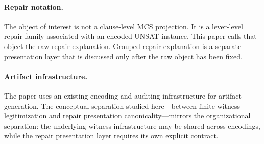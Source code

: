 \paragraph{Repair notation.}
The object of interest is not a clause-level MCS projection.
It is a lever-level repair family associated with an encoded UNSAT instance.
This paper calls that object the raw repair explanation.
Grouped repair explanation is a separate presentation layer that is discussed only after the raw object has been fixed.

\paragraph{Artifact infrastructure.}
The paper uses an existing encoding and auditing infrastructure for artifact generation.
The conceptual separation studied here---between finite witness legitimization and repair presentation canonicality---mirrors the organizational separation: the underlying witness infrastructure may be shared across encodings, while the repair presentation layer requires its own explicit contract.
